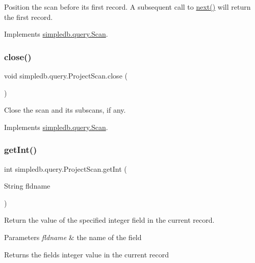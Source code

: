 Position the scan before its first record. A subsequent call to \hyperlink{classsimpledb_1_1query_1_1ProjectScan_ae90eaf25301873aba0a2f743becf7c9a}{next()} will return the first record. 

Implements \hyperlink{interfacesimpledb_1_1query_1_1Scan_a2eceb634b69da9bf1269a4355808cc6b}{simpledb.\+query.\+Scan}.

\mbox{\label{classsimpledb_1_1query_1_1ProjectScan_a192669ae4807d1f623fe6200fe37522f}} 
\subsubsection{\texorpdfstring{close()}{close()}}
{\footnotesize\ttfamily void simpledb.\+query.\+Project\+Scan.\+close (\begin{DoxyParamCaption}{ }\end{DoxyParamCaption})\hspace{0.3cm}{\ttfamily [inline]}}

Close the scan and its subscans, if any. 

Implements \hyperlink{interfacesimpledb_1_1query_1_1Scan_a260f40a8c82edaa00398bea9d698933c}{simpledb.\+query.\+Scan}.

\mbox{\label{classsimpledb_1_1query_1_1ProjectScan_a89039656c72ea917c18442e8f3627d14}} 
\subsubsection{\texorpdfstring{get\+Int()}{getInt()}}
{\footnotesize\ttfamily int simpledb.\+query.\+Project\+Scan.\+get\+Int (\begin{DoxyParamCaption}\item[{String}]{fldname }\end{DoxyParamCaption})\hspace{0.3cm}{\ttfamily [inline]}}

Return the value of the specified integer field in the current record. 
\begin{DoxyParams}{Parameters}
{\em fldname} & the name of the field \\
\hline
\end{DoxyParams}
\begin{DoxyReturn}{Returns}
the field\textquotesingle{}s integer value in the current record 
\end{DoxyReturn}


